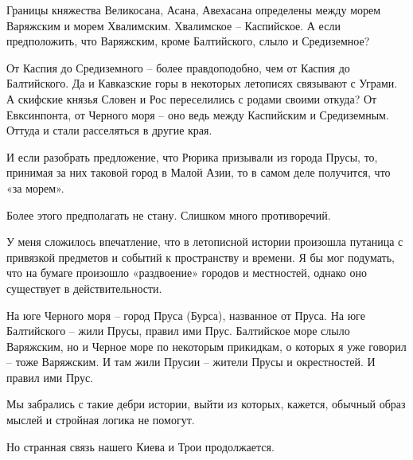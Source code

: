 Границы княжества Великосана, Асана, Авехасана определены между морем Варяжским и морем Хвалимским. Хвалимское – Каспийское. А если предположить, что Варяжским, кроме Балтийского, слыло и Средиземное? 

От Каспия до Средиземного – более правдоподобно, чем от Каспия до Балтийского. Да и Кавказские горы в некоторых летописях связывают с Уграми. А скифские князья Словен и Рос переселились с родами своими откуда? От Евксинпонта, от Черного моря – оно ведь между Каспийским и Средиземным. Оттуда и стали расселяться в другие края.

И если разобрать предложение, что Рюрика призывали из города Прусы, то, принимая за них таковой город в Малой Азии, то в самом деле получится, что «за морем».

Более этого предполагать не стану. Слишком много противоречий.

У меня сложилось впечатление, что в летописной истории произошла путаница с привязкой предметов и событий к пространству и времени. Я бы мог подумать, что на бумаге произошло «раздвоение» городов и местностей, однако оно существует в действительности. 

На юге Черного моря – город Пруса (Бурса), названное от Пруса. На юге Балтийского – жили Прусы, правил ими Прус. Балтийское море слыло Варяжским, но и Черное море по некоторым прикидкам, о которых я уже говорил – тоже Варяжским. И там жили Прусии – жители Прусы и окрестностей. И правил ими Прус.

Мы забрались с такие дебри истории, выйти из которых, кажется, обычный образ мыслей и стройная логика не помогут.

Но странная связь нашего Киева и Трои продолжается.
